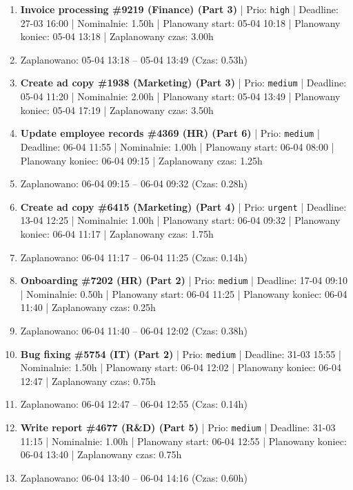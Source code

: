 {\begin{enumerate}
  \item [\textbf{14622}] \textbf{Invoice processing \#9219 (Finance) (Part 3)} | Prio: \texttt{high} | Deadline: 27-03 16:00 | Nominalnie: 1.50h | Planowany start: 05-04 10:18 | Planowany koniec: 05-04 13:18 | Zaplanowany czas: 3.00h
  \item [\textbf{PRZERWA}] Zaplanowano: 05-04 13:18 -- 05-04 13:49 (Czas: 0.53h)
  \item [\textbf{14652}] \textbf{Create ad copy \#1938 (Marketing) (Part 3)} | Prio: \texttt{medium} | Deadline: 05-04 11:20 | Nominalnie: 2.00h | Planowany start: 05-04 13:49 | Planowany koniec: 05-04 17:19 | Zaplanowany czas: 3.50h
  \item [\textbf{14658}] \textbf{Update employee records \#4369 (HR) (Part 6)} | Prio: \texttt{medium} | Deadline: 06-04 11:55 | Nominalnie: 1.00h | Planowany start: 06-04 08:00 | Planowany koniec: 06-04 09:15 | Zaplanowany czas: 1.25h
  \item [\textbf{PRZERWA}] Zaplanowano: 06-04 09:15 -- 06-04 09:32 (Czas: 0.28h)
  \item [\textbf{14602}] \textbf{Create ad copy \#6415 (Marketing) (Part 4)} | Prio: \texttt{urgent} | Deadline: 13-04 12:25 | Nominalnie: 1.00h | Planowany start: 06-04 09:32 | Planowany koniec: 06-04 11:17 | Zaplanowany czas: 1.75h
  \item [\textbf{PRZERWA}] Zaplanowano: 06-04 11:17 -- 06-04 11:25 (Czas: 0.14h)
  \item [\textbf{14648}] \textbf{Onboarding \#7202 (HR) (Part 2)} | Prio: \texttt{medium} | Deadline: 17-04 09:10 | Nominalnie: 0.50h | Planowany start: 06-04 11:25 | Planowany koniec: 06-04 11:40 | Zaplanowany czas: 0.25h
  \item [\textbf{PRZERWA}] Zaplanowano: 06-04 11:40 -- 06-04 12:02 (Czas: 0.38h)
  \item [\textbf{14631}] \textbf{Bug fixing \#5754 (IT) (Part 2)} | Prio: \texttt{medium} | Deadline: 31-03 15:55 | Nominalnie: 1.50h | Planowany start: 06-04 12:02 | Planowany koniec: 06-04 12:47 | Zaplanowany czas: 0.75h
  \item [\textbf{PRZERWA}] Zaplanowano: 06-04 12:47 -- 06-04 12:55 (Czas: 0.14h)
  \item [\textbf{14640}] \textbf{Write report \#4677 (R\&D) (Part 5)} | Prio: \texttt{medium} | Deadline: 31-03 11:15 | Nominalnie: 1.00h | Planowany start: 06-04 12:55 | Planowany koniec: 06-04 13:40 | Zaplanowany czas: 0.75h
  \item [\textbf{PRZERWA}] Zaplanowano: 06-04 13:40 -- 06-04 14:16 (Czas: 0.60h)

\end{enumerate}}
